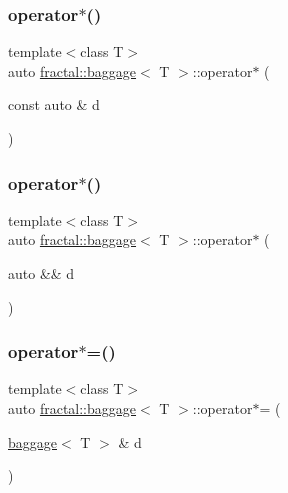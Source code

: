 \mbox{\label{classfractal_1_1baggage_ac202db9fa4879077994458ed3e91967c}} 
\subsubsection{\texorpdfstring{operator$\ast$()}{operator*()}\hspace{0.1cm}{\footnotesize\ttfamily [2/3]}}
{\footnotesize\ttfamily template$<$class T$>$ \\
auto \hyperlink{classfractal_1_1baggage}{fractal\+::baggage}$<$ T $>$\+::operator$\ast$ (\begin{DoxyParamCaption}\item[{const auto \&}]{d }\end{DoxyParamCaption})\hspace{0.3cm}{\ttfamily [inline]}}

\mbox{\label{classfractal_1_1baggage_ae5942f4512f10a45d544ab5752beab85}} 
\subsubsection{\texorpdfstring{operator$\ast$()}{operator*()}\hspace{0.1cm}{\footnotesize\ttfamily [3/3]}}
{\footnotesize\ttfamily template$<$class T$>$ \\
auto \hyperlink{classfractal_1_1baggage}{fractal\+::baggage}$<$ T $>$\+::operator$\ast$ (\begin{DoxyParamCaption}\item[{auto \&\&}]{d }\end{DoxyParamCaption})\hspace{0.3cm}{\ttfamily [inline]}}

\mbox{\label{classfractal_1_1baggage_a4e874f81a01e3a13293163e4908eddf1}} 
\subsubsection{\texorpdfstring{operator$\ast$=()}{operator*=()}\hspace{0.1cm}{\footnotesize\ttfamily [1/3]}}
{\footnotesize\ttfamily template$<$class T$>$ \\
auto \hyperlink{classfractal_1_1baggage}{fractal\+::baggage}$<$ T $>$\+::operator$\ast$= (\begin{DoxyParamCaption}\item[{\hyperlink{classfractal_1_1baggage}{baggage}$<$ T $>$ \&}]{d }\end{DoxyParamCaption})\hspace{0.3cm}{\ttfamily [inline]}}

